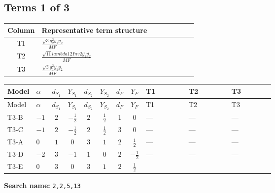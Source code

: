 \documentclass[8pt]{article}
\begin{document}
\begin{landscape}
\subsection*{Terms 1 of 3}
\begin{center}
\begin{tabular}{@{}c >{\raggedright\arraybackslash}p{0.82\linewidth}@{}}
\toprule
Column & Representative term structure \\
\midrule
T1 & \(\displaystyle \frac{\sqrt{3} g_{2}^{2} \overline{y_{1}} \overline{y_{2}}}{MF}\) \\
\midrule
T2 & \(\displaystyle \frac{\sqrt{11} lambda12Inv2 \overline{y_{1}} \overline{y_{2}}}{MF}\) \\
\midrule
T3 & \(\displaystyle \frac{\sqrt{3} g_{1}^{2} \overline{y_{1}} \overline{y_{2}}}{MF}\) \\
\midrule
\bottomrule
\end{tabular}
\end{center}
\smallskip
\tiny
\begin{longtable}{@{}llcccccc >{\raggedright\arraybackslash}p{0.21\linewidth} >{\raggedright\arraybackslash}p{0.21\linewidth} >{\raggedright\arraybackslash}p{0.21\linewidth}@{}}
\toprule
Model & $\alpha$ & $d_{S_1}$ & $Y_{S_1}$ & $d_{S_2}$ & $Y_{S_2}$ & $d_F$ & $Y_F$ & T1 & T2 & T3 \\
\midrule
\endfirsthead
\toprule
Model & $\alpha$ & $d_{S_1}$ & $Y_{S_1}$ & $d_{S_2}$ & $Y_{S_2}$ & $d_F$ & $Y_F$ & T1 & T2 & T3 \\
\midrule
\endhead
T3-B & $-1$ & $2$ & $-\frac{1}{2}$ & $2$ & $\frac{1}{2}$ & $1$ & $0$ & --- & --- & --- \\
\midrule
T3-C & $-1$ & $2$ & $-\frac{1}{2}$ & $2$ & $\frac{1}{2}$ & $3$ & $0$ & --- & --- & --- \\
\midrule
T3-A & $0$ & $1$ & $0$ & $3$ & $1$ & $2$ & $\frac{1}{2}$ & --- & --- & --- \\
\midrule
T3-D & $-2$ & $3$ & $-1$ & $1$ & $0$ & $2$ & $-\frac{1}{2}$ & --- & --- & --- \\
\midrule
T3-E & $0$ & $3$ & $0$ & $3$ & $1$ & $2$ & $\frac{1}{2}$ & \scriptsize\adjustbox{max width=\linewidth}{$\begin{gathered} - \frac{49 \sqrt{3} g_{2}^{2} \overline{y_{1}} \overline{y_{2}}}{24 MF}\end{gathered}$} & \scriptsize\adjustbox{max width=\linewidth}{$\begin{gathered} - \frac{3 \sqrt{11} lambda12Inv2 \overline{y_{1}} \overline{y_{2}}}{22 MF}\end{gathered}$} & \scriptsize\adjustbox{max width=\linewidth}{$\begin{gathered} - \frac{\sqrt{3} g_{1}^{2} \overline{y_{1}} \overline{y_{2}}}{8 MF}\end{gathered}$} \\
\midrule
\bottomrule
\end{longtable}
\clearpage
\noindent\textbf{Search name: }\texttt{2,2,5,13}\par\smallskip

\end{landscape}
\end{document}
